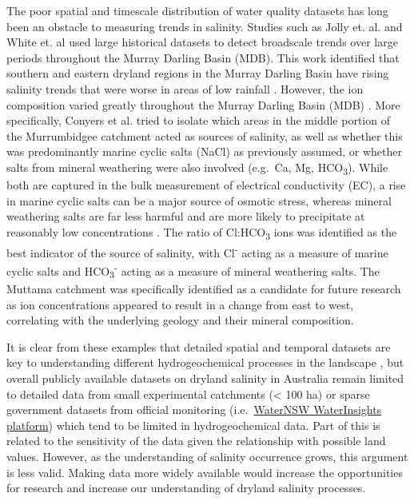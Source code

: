 \documentclass[, manuscript]{copernicus}
\begin{document}
The poor spatial and timescale distribution of water quality datasets
has long been an obstacle to measuring trends in salinity. Studies such
as Jolly et. al. \citeyearpar{Jolly2001} and White et. al
\citeyearpar{White2009} used large historical datasets to detect
broadscale trends over large periods throughout the Murray Darling Basin
(MDB). This work identified that southern and eastern dryland regions in
the Murray Darling Basin have rising salinity trends that were worse in
areas of low rainfall \citep{White2009, Jolly2001}. However, the ion
composition varied greatly throughout the Murray Darling Basin (MDB)
\citep{White2009}. More specifically, Conyers et al.
\citeyearpar{Conyers2008} tried to isolate which areas in the middle
portion of the Murrumbidgee catchment acted as sources of salinity, as
well as whether this was predominantly marine cyclic salts (NaCl) as
previously assumed, or whether salts from mineral weathering were also
involved (e.g.~Ca, Mg, HCO\textsubscript{3}). While both are captured in
the bulk measurement of electrical conductivity (EC), a rise in marine
cyclic salts can be a major source of osmotic stress, whereas mineral
weathering salts are far less harmful and are more likely to precipitate
at reasonably low concentrations \citep{Conyers2008}. The ratio of
Cl:HCO\textsubscript{3} ions was identified as the best indicator of the
source of salinity, with Cl\textsuperscript{-} acting as a measure of
marine cyclic salts and HCO\textsubscript{3}\textsuperscript{-} acting
as a measure of mineral weathering salts. The Muttama catchment was
specifically identified as a candidate for future research as ion
concentrations appeared to result in a change from east to west,
correlating with the underlying geology and their mineral composition.

It is clear from these examples that detailed spatial and temporal
datasets are key to understanding different hydrogeochemical processes
in the landscape \citep[e.g.][]{Cartwright2010, Dalhaus2010}, but
overall publicly available datasets on dryland salinity in Australia
remain limited to detailed data from small experimental catchments
(\textless{} 100 ha) \citep{Summerell2006, crosbie2007, Hughes2007} or
sparse government datasets from official monitoring
(i.e.~\href{https://waterinsights.waternsw.com.au/}{WaterNSW
WaterInsights platform}) which tend to be limited in hydrogeochemical
data. Part of this is related to the sensitivity of the data given the
relationship with possible land values. However, as the understanding of
salinity occurrence grows, this argument is less valid. Making data more
widely available would increase the opportunities for research and
increase our understanding of dryland salinity processes.
\end{document}
